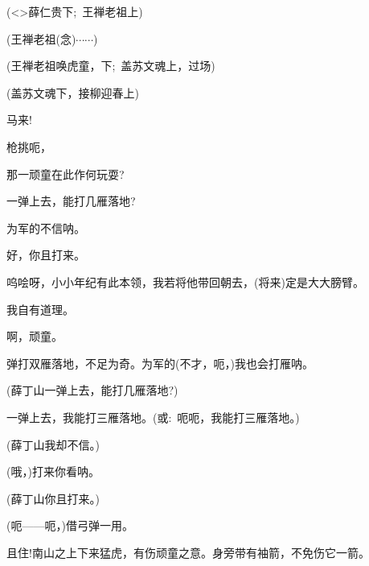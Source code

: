 {

(\textless{}\!\textgreater{}薛仁贵{\hwfs 下};~王禅老祖{\hwfs 上})

(王禅老祖\hspace{10pt}({\akai 念})$\cdots{}\cdots{}$)

(王禅老祖{\hwfs 唤}虎童，{\hwfs 下};~盖苏文魂{\hwfs 上}，{\hwfs 过场})


(盖苏文魂{\hwfs 下}，{\hwfs 接}柳迎春{\hwfs 上})

\vspace{5pt}

马来!


枪挑{\footnotesize 呃}，


那一顽童在此作何玩耍?

一弹上去，能打几雁落地?

为军的不信{\footnotesize 呐}。

好，你且打来。

呜哙呀，小小年纪有此本领，我若将他带回朝去，(将来)定是大大膀臂。

我自有道理。

啊，顽童。

弹打双雁落地，不足为奇。为军的(不才，呃，)我也会打雁{\footnotesize 呐}。

(薛丁山\hspace{20pt}一弹上去，能打几雁落地?)

一弹上去，我能打三雁落地。({\akai 或}:~呃呃，我能打三雁落地。)

(薛丁山\hspace{20pt}我却不信。)

(哦，)打来你看呐。

(薛丁山\hspace{20pt}你且打来。)

(呃------呃，)借弓弹一用。

且住!南山之上下来猛虎，有伤顽童之意。身旁带有袖箭，不免伤它一箭。

}
